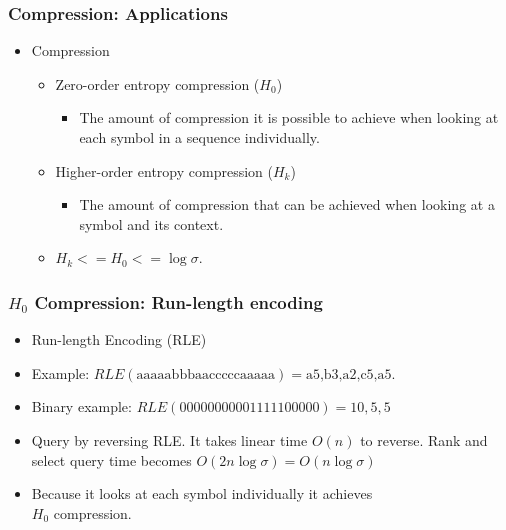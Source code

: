 \documentclass{beamer}
\begin{document}
\begin{frame}
\frametitle{Compression: Applications}
\begin{itemize}
\item Compression
	\begin{itemize}
	\setlength\itemsep{1em}
	\item Zero-order entropy compression ($H_0$)
	\begin{itemize}
	\item The amount of compression it is possible to achieve when looking at each symbol in a sequence individually.
	\end{itemize}
	\item Higher-order entropy compression ($H_k$)
	\begin{itemize}
	\item The amount of compression that can be achieved when looking at a symbol and its context.
	\end{itemize}
	\item $H_k <= H_0 <= \log \sigma$.
	\end{itemize}
\end{itemize}
\end{frame}

\begin{frame}
\frametitle{$H_0$ Compression: Run-length encoding}
\begin{itemize}
\setlength\itemsep{1em}
\item Run-length Encoding (RLE)
\item Example: $RLE(\text{aaaaabbbaacccccaaaaa}) = \text{a5,b3,a2,c5,a5}$.
\item Binary example: $RLE(00000000001111100000) = 10,5,5 $
\item Query by reversing RLE. It takes linear time $O(n)$ to reverse. Rank and select query time becomes $O(2n \log \sigma) = O(n \log \sigma)$
\item Because it looks at each symbol individually it achieves \\$H_0$ compression.
\end{itemize}
\end{frame}
\end{document}
